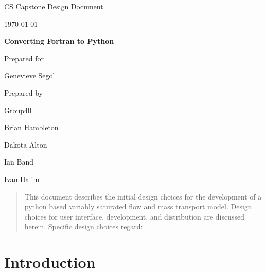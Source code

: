\documentclass[onecolumn, draftclsnofoot,10pt, compsoc]{IEEEtran}
\def \CapstoneTeamName{The Cleverly Named Team}
\def \CapstoneTeamNumber{40}
\def \GroupMemberOne{Brian Hambleton}
\def \GroupMemberTwo{Dakota Alton}
\def \GroupMemberThree{Ian Band}
\def \GroupMemberFour{Ivan Halim}
\def \CapstoneProjectName{Converting Fortran to Python}
\def \CapstoneSponsorPerson{Genevieve Segol}
\def \DocType{Design Document}
\newcommand{\NameSigPair}[1]{\par
\makebox[2.75in][r]{#1} \hfil 	\makebox[3.25in]{\makebox[2.25in]{\hrulefill} \hfill		\makebox[.75in]{\hrulefill}}
\par\vspace{-12pt} \textit{\tiny\noindent
\makebox[2.75in]{} \hfil		\makebox[3.25in]{\makebox[2.25in][r]{Signature} \hfill	\makebox[.75in][r]{Date}}}}
\renewcommand{\NameSigPair}[1]{#1}
\begin{document}
\begin{titlepage}
    \begin{singlespace}
        \hfill 
        \par\vspace{.2in}
        \centering
        \scshape{
            \huge CS Capstone \DocType \par
            {\large\today}\par
            \vspace{.5in}
            \textbf{\Huge\CapstoneProjectName}\par
            \vfill
            {\large Prepared for}\par
            {\Huge\NameSigPair{\CapstoneSponsorPerson}\par}
            {\large Prepared by }\par
            Group\CapstoneTeamNumber\par
            \vspace{5pt}
            {\Large
                \NameSigPair{\GroupMemberOne}\par
                \NameSigPair{\GroupMemberTwo}\par
                \NameSigPair{\GroupMemberThree}\par
                \NameSigPair{\GroupMemberFour}\par
            }
            \vspace{20pt}
        }
        \begin{abstract}  
        	This document describes the initial design choices for the development of a python based variably saturated flow and mass transport model. Design choices for user interface, development, and distribution are discussed herein. Specific design choices regard: 
        \end{abstract}     
    \end{singlespace}
\end{titlepage}
\newpage
{}
\tableofcontents
\clearpage

\section{Introduction}
\end{document}
